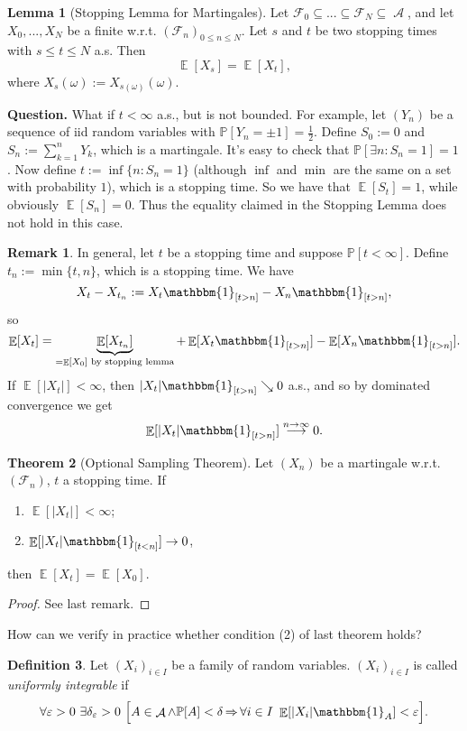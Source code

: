 \documentclass[12pt,a4paper]{report}
\theoremstyle{definition}
\newtheorem{theorem}{Theorem}[chapter] %
\newtheorem{lemma}[theorem]{Lemma}
\newtheorem{definition}[theorem]{Definition}
\newtheorem*{remark}{Remark}
\theoremstyle{num.custom-title}
\DeclareMathOperator{\A}{\mathcal{A}}
\DeclareMathOperator{\E}{\mathbb{E}}
\DeclareMathOperator{\imp}{\Rightarrow}
\DeclareMathOperator{\sse}{\subseteq}
\newcommand{\F}{\mathcal{F}}
\renewcommand{\epsilon}{\varepsilon}
\renewcommand{\1}{\mathbbm{1}}
\renewcommand{\P}{\mathbb{P}}
\begin{document}
\begin{lemma}[Stopping Lemma for Martingales]
	Let $\F_0 \sse ... \sse \F_N \sse \A$, and let $X_0,...,X_N$ be a finite w.r.t. $(\F_n)_{0 \leq n \leq N}$. Let $s$ and $t$ be two stopping times with $s \leq t \leq N$ a.s. Then 
	\[
	\E[X_s] = \E[X_t],
	\]
	where $X_s(\omega) := X_{s(\omega)}(\omega)$.
\end{lemma}

\noindent\textbf{Question.} What if $t < \infty$ a.s., but is not bounded. For example, let $(Y_n)$ be a sequence of iid random variables with $\P[Y_n=\pm 1] = \frac{1}{2}$. Define $S_0 := 0$ and $S_n := \sum_{k=1}^{n} Y_k$, which is a martingale. It's easy to check that $\P[\exists n : S_n=1]=1$. Now define $t := \inf\{n : S_n = 1\}$ (although $\inf$ and $\min$ are the same on a set with probability $1$), which is a stopping time. So we have that $\E[S_t]=1$, while obviously $\E[S_n]=0$. Thus the equality claimed in the Stopping Lemma does not hold in this case.

\begin{remark}
	In general, let $t$ be a stopping time and suppose $\P[t < \infty]$. Define $t_n := \min\{t,n\}$, which is a stopping time. We have
	\[
	X_t - X_{t_n} := X_t \1_{[t>n]} - X_n \1_{[t>n]},
	\]
	so
	\[
	\E[X_t] = \underbrace{\E[X_{t_n}]}_{=\E[X_0] \text{ by stopping lemma}} + \E[X_t \1_{[t>n]}] - \E[X_n \1_{[t>n]}].
	\]
	If $\E[|X_t|] < \infty$, then $|X_t| \1_{[t>n]} \searrow 0$ a.s., and so by dominated convergence we get
	\[
	\E[|X_t| \1_{[t>n]}] \stackrel{n \to \infty}{\longrightarrow} 0.
	\]
\end{remark}

\begin{theorem}[Optional Sampling Theorem]
	Let $(X_n)$ be a martingale w.r.t. $(\F_n)$, $t$ a stopping time. If
	\begin{enumerate}
		\item $\E[|X_t|]<\infty$;
		\item $\E[|X_t| \1_{[t<n]}] \to 0$,
	\end{enumerate}
	then $\E[X_t]=\E[X_0]$.
\begin{proof}
	See last remark.
\end{proof}
\end{theorem}

How can we verify in practice whether condition (2) of last theorem holds?

\begin{definition}
	Let $(X_i)_{i \in I}$ be a family of random variables. $(X_i)_{i \in I}$ is called \emph{uniformly integrable} if
	\[
	\forall \epsilon>0 \ \exists \delta_\epsilon > 0 \ \Big[ A \in \A \wedge \P[A]<\delta \imp \forall i \in I \ \E[|X_i| \1_A]<\epsilon \Big].
	\]
\end{definition}
\end{document}
